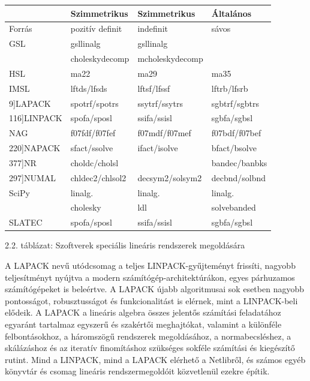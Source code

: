 \documentclass[
  magyar,
  11pt]{article}
\begin{document}
\begin{longtable}[]{@{}
  >{\raggedright\arraybackslash}p{}
  >{\raggedright\arraybackslash}p{}
  >{\raggedright\arraybackslash}p{}
  >{\raggedright\arraybackslash}p{}@{}}
\toprule\noalign{}
\begin{minipage}[b]{\linewidth}\raggedright
\end{minipage} & \begin{minipage}[b]{\linewidth}\raggedright
Szimmetrikus
\end{minipage} & \begin{minipage}[b]{\linewidth}\raggedright
Szimmetrikus
\end{minipage} & \begin{minipage}[b]{\linewidth}\raggedright
Általános
\end{minipage} \\
\midrule\noalign{}
\endhead
\bottomrule\noalign{}
\endlastfoot
Forrás & pozitív definit & indefinit & sávos \\
GSL & gsllinalg & gsllinalg & \\
& choleskydecomp & mcholeskydecomp & \\
HSL & ma22 & ma29 & ma35 \\
IMSL & lftds/lfsds & lftsf/lfssf & lftrb/lfsrb \\
{[}9{]}LAPACK & spotrf/spotrs & ssytrf/ssytrs & sgbtrf/sgbtrs \\
{[}116{]}LINPACK & spofa/sposl & ssifa/ssisl & sgbfa/sgbsl \\
NAG & f07fdf/f07fef & f07mdf/f07mef & f07bdf/f07bef \\
{[}220{]}NAPACK & sfact/ssolve & ifact/isolve & bfact/bsolve \\
{[}377{]}NR & choldc/cholsl & & bandec/banbks \\
{[}297{]}NUMAL & chldec2/chlsol2 & decsym2/solsym2 & decbnd/solbnd \\
SciPy & linalg. & linalg. & linalg. \\
& cholesky & ldl & solvebanded \\
SLATEC & spofa/sposl & ssifa/ssisl & sgbfa/sgbsl \\
\end{longtable}

2.2. táblázat: Szoftverek speciális lineáris rendszerek megoldására

A LAPACK nevű utódcsomag a teljes LINPACK-gyűjteményt frissíti, nagyobb
teljesítményt nyújtva a modern számítógép-architektúrákon, egyes
párhuzamos számítógépeket is beleértve. A LAPACK újabb algoritmusai sok
esetben nagyobb pontosságot, robusztusságot és funkcionalitást is
elérnek, mint a LINPACK-beli elődeik. A LAPACK a lineáris algebra összes
jelentős számítási feladatához egyaránt tartalmaz egyszerű és szakértői
meghajtókat, valamint a különféle felbontásokhoz, a háromszögű
rendszerek megoldásához, a normabecsléshez, a skálázáshoz és az iteratív
finomításhoz szükséges sokféle számítási és kiegészítő rutint. Mind a
LINPACK, mind a LAPACK elérhető a Netlibről, és számos egyéb könyvtár és
csomag lineáris rendszermegoldóit közvetlenül ezekre építik.
\end{document}
